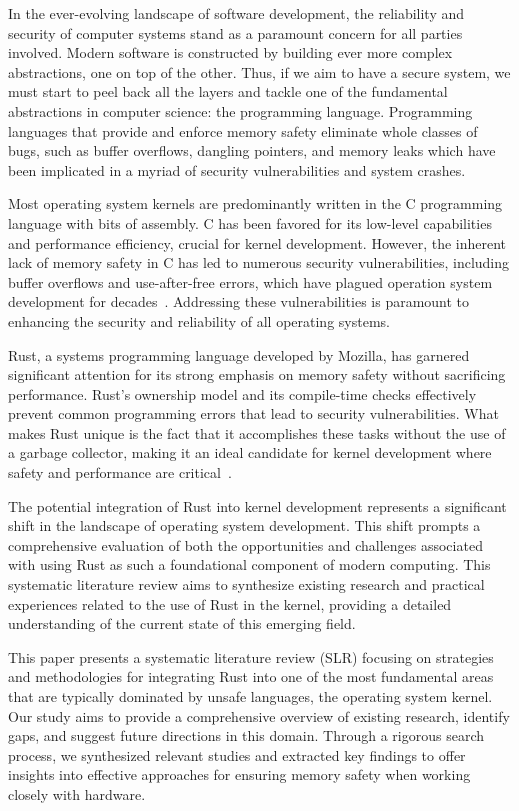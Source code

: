 \documentclass[sigconf,review,anonymous]{acmart}
\begin{document}
In the ever-evolving landscape of software development, the reliability and security of computer
systems stand as a paramount concern for all parties involved. Modern software is constructed by
building ever more complex abstractions, one on top of the other. Thus, if we aim to have a secure
system, we must start to peel back all the layers and tackle one of the fundamental abstractions in
computer science: the programming language. Programming languages that provide and enforce memory
safety eliminate whole classes of bugs, such as buffer overflows, dangling pointers, and memory leaks
which have been implicated in a myriad of security vulnerabilities and system crashes.

Most operating system kernels are predominantly written in the C programming language with bits of
assembly. C has been favored for its low-level capabilities and performance efficiency, crucial for
kernel development. However, the inherent lack of memory safety in C has led to numerous security
vulnerabilities, including buffer overflows and use-after-free errors, which have plagued operation
system development for decades~\cite{noauthor_2019-bf}. Addressing these vulnerabilities is
paramount to enhancing the security and reliability of all operating systems.

Rust, a systems programming language developed by Mozilla, has garnered significant attention for
its strong emphasis on memory safety without sacrificing performance. Rust's ownership model and its
compile-time checks effectively prevent common programming errors that lead to security
vulnerabilities. What makes Rust unique is the fact that it accomplishes these tasks without the use
of a garbage collector, making it an ideal candidate for kernel development where safety and
performance are critical~\cite{}.



The potential integration of Rust into kernel development represents a significant shift in the
landscape of operating system development. This shift prompts a comprehensive evaluation of both the
opportunities and challenges associated with using Rust as such a foundational component of modern
computing. This systematic literature review aims to synthesize existing research and practical
experiences related to the use of Rust in the kernel, providing a detailed understanding of
the current state of this emerging field.

This paper presents a systematic literature review (SLR) focusing on strategies and methodologies
for integrating Rust into one of the most fundamental areas that are typically dominated by unsafe
languages, the operating system kernel. Our study aims to provide a comprehensive overview of
existing research, identify gaps, and suggest future directions in this domain. Through a rigorous
search process, we synthesized relevant studies and extracted key findings to offer insights into
effective approaches for ensuring memory safety when working closely with hardware.
\end{document}
